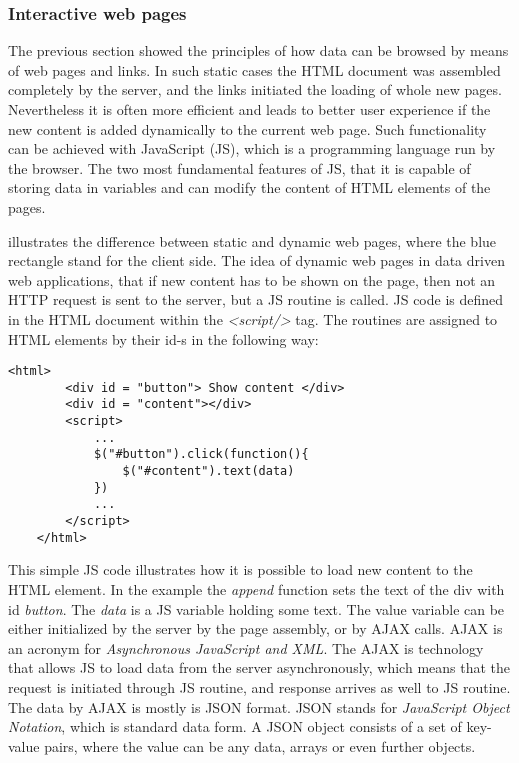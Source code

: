 \newpage

\subsubsection{Interactive web pages}

The previous section showed the principles of how data can be browsed by means of web pages and links. In such static cases the HTML document was assembled completely by the server, and the links initiated the loading of whole new pages. Nevertheless it is often more efficient and leads to better user experience if the new content is added dynamically to the current web page. Such functionality can be achieved with JavaScript (JS), which is a programming language run by the browser. The two most fundamental features of JS, that it is capable of storing data in variables and can modify the content of HTML elements of the pages. 


 illustrates the difference between static and dynamic web pages, where the blue rectangle stand for the client side. The idea of dynamic web pages in data driven web applications, that if new content has to be shown on the page, then not an HTTP request is sent to the server, but a JS routine is called. JS code is defined in the HTML document within the \textit{<script/>} tag. The routines are assigned to HTML elements by their id-s in the following way:

\begin{lstlisting}[captionpos=b, caption=JavaScript routine assigned to an HTML element, label=jsListing, belowskip=1em, aboveskip=2em,
basicstyle=\footnotesize,frame=single]
	<html>
		<div id = "button"> Show content </div>
		<div id = "content"></div>
		<script>
			...
			$("#button").click(function(){
				$("#content").text(data)
			})
			...	
		</script>
	</html>
\end{lstlisting}


This simple JS code illustrates how it is possible to load new content to the HTML element. In the example the \textit{append} function sets the text of the div with id \textit{button}. The \textit{data} is a JS variable holding
some text. The value variable can be either initialized by the server by the page assembly, or by AJAX calls. AJAX is an acronym for \textit{Asynchronous JavaScript and XML}. The AJAX is technology that allows JS to load data from the server asynchronously, which means that the request is initiated through JS routine, and response arrives as well to JS routine. The data by AJAX is mostly is JSON format. JSON stands for \textit{JavaScript Object Notation}, which is standard data form. A JSON object consists of a set of key-value pairs, where the value can be any data, arrays or even further objects.

